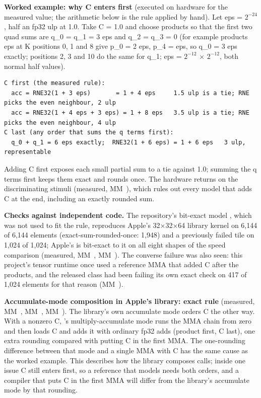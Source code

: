 \textbf{Worked example: why C enters first} (executed on hardware for the measured value; the arithmetic below is the rule
applied by hand). Let eps = $2^{-24}$, half an fp32 ulp at 1.0. Take C = 1.0 and choose products so that the first two
quad sums are q\_0 = q\_1 = 3 eps and q\_2 = q\_3 = 0 (for example products eps at K positions 0, 1 and 8 give
p\_0 = 2 eps, p\_4 = eps, so q\_0 = 3 eps exactly; positions 2, 3 and 10 do the same for q\_1; eps = $2^{-12}$ × $2^{-12}$, both
normal half values).

\begin{lstlisting}
C first (the measured rule):
  acc = RNE32(1 + 3 eps)       = 1 + 4 eps     1.5 ulp is a tie; RNE picks the even neighbour, 2 ulp
  acc = RNE32(1 + 4 eps + 3 eps) = 1 + 8 eps   3.5 ulp is a tie; RNE picks the even neighbour, 4 ulp
C last (any order that sums the q terms first):
  q_0 + q_1 = 6 eps exactly;  RNE32(1 + 6 eps) = 1 + 6 eps   3 ulp, representable
\end{lstlisting}

Adding C first exposes each small partial sum to a tie against 1.0; summing the q terms first keeps them exact and
rounds once. The hardware returns  on the discriminating stimuli (measured, MM~), which rules out every
model that adds C at the end, including an exactly rounded sum.

\textbf{Checks against independent code.} The repository's
bit-exact model , which was not used to fit the rule, reproduces Apple's 32×32×64 library kernel on 6,144 of 6,144
elements (exact-sum-rounded-once: 1,948) and a previously failed tile on 1,024 of 1,024; Apple's  is
bit-exact to it on all eight shapes of the speed comparison (measured, MM~, MM~). The converse failure was
also seen: this project's tensor runtime once used a reference MMA that added C after the products, and the released
 class had been failing its own exact check on 417 of 1,024 elements for that reason (MM~).

\textbf{Accumulate-mode composition in Apple's library: exact rule} (measured, MM~, MM~,
MM~). The library's own accumulate mode orders C the other way. With a nonzero C, 's
multiply-accumulate mode runs the MMA chain from zero and then loads C and adds it with ordinary fp32 adds (product
first, C last), one extra rounding compared with putting C in the first MMA. The one-rounding difference between that
mode and a single MMA with C has the same cause as the worked example. This describes how the library composes calls;
inside one issue C still enters first, so a reference that models  needs both orders, and a compiler that
puts C in the first MMA will differ from the library's accumulate mode by that rounding.


